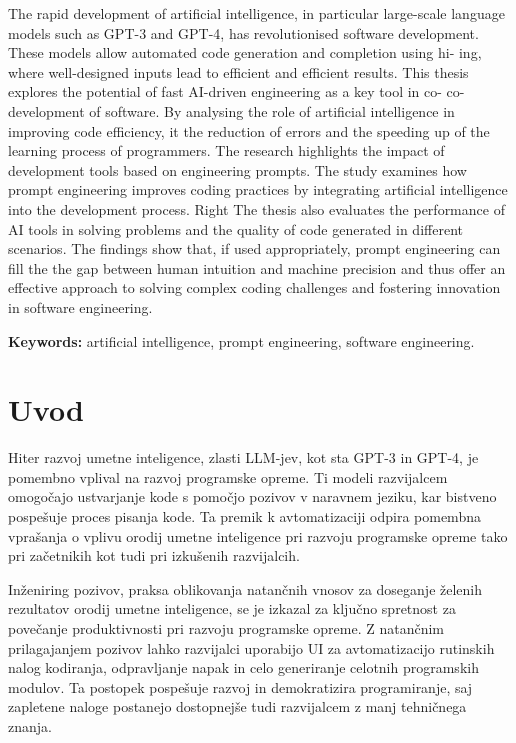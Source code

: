\documentclass[a4paper,12pt,openright]{book}
\newcommand{\tkeywordsEn}{artificial intelligence, prompt engineering, software engineering}
\newcommand{\clearemptydoublepage}{\newpage{\pagestyle{empty}\cleardoublepage}}
\begin{document}
\noindent The rapid development of artificial intelligence, in particular large-scale language models such as
GPT-3 and GPT-4, has revolutionised software development. These models
allow automated code generation and completion using hi-
ing, where well-designed inputs lead to efficient and
efficient results. This thesis explores the potential of fast
AI-driven engineering as a key tool in co-
co-development of software.
By analysing the role of artificial intelligence in improving code efficiency, it
the reduction of errors and the speeding up of the learning process of programmers.
The research highlights the impact of development tools based on
engineering prompts. The study examines how prompt engineering improves
coding practices by integrating artificial intelligence into the development process. Right
The thesis also evaluates the performance of AI tools in solving
problems and the quality of code generated in different scenarios.
The findings show that, if used appropriately, prompt engineering can fill the
the gap between human intuition and machine precision and thus offer an effective
approach to solving complex coding challenges and fostering innovation in
software engineering.
\bigskip

\noindent\textbf{Keywords:} \tkeywordsEn.
\clearemptydoublepage


\chapter{Uvod}

Hiter razvoj umetne inteligence, zlasti LLM-jev, kot sta GPT-3 in GPT-4, je pomembno vplival na razvoj programske opreme. Ti modeli razvijalcem omogočajo ustvarjanje kode s pomočjo pozivov v naravnem jeziku, kar bistveno pospešuje proces pisanja kode. Ta premik k avtomatizaciji odpira pomembna vprašanja o vplivu orodij umetne inteligence pri razvoju programske opreme tako pri začetnikih kot tudi pri izkušenih razvijalcih.


Inženiring pozivov, praksa oblikovanja natančnih vnosov za doseganje želenih rezultatov orodij umetne inteligence, se je izkazal za ključno spretnost za povečanje produktivnosti pri razvoju programske opreme. Z natančnim prilagajanjem pozivov lahko razvijalci uporabijo UI za avtomatizacijo rutinskih nalog kodiranja, odpravljanje napak in celo generiranje celotnih programskih modulov. Ta postopek pospešuje razvoj in demokratizira programiranje, saj zapletene naloge postanejo dostopnejše tudi razvijalcem z manj tehničnega znanja.
\end{document}
